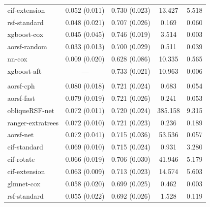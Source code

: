 \documentclass[twoside,11pt]{article}\usepackage[]{graphicx}\usepackage[]{xcolor}
\newenvironment{knitrout}{}{} %
\begin{document}
\begin{knitrout}
\begin{longtable}[t]{lcccc}
\hspace{1em}cif-extension & 0.052 (0.011) & 0.730 (0.023) & 13.427 & 5.518\\
\hspace{1em}rsf-standard & 0.048 (0.021) & 0.707 (0.026) & 0.169 & 0.060\\
\hspace{1em}xgboost-cox & 0.045 (0.045) & 0.746 (0.019) & 3.514 & 0.003\\
\hspace{1em}aorsf-random & 0.033 (0.013) & 0.700 (0.029) & 0.511 & 0.039\\
\hspace{1em}nn-cox & 0.009 (0.020) & 0.628 (0.086) & 10.335 & 0.565\\
\hspace{1em}xgboost-aft & --- & 0.733 (0.021) & 10.963 & 0.006\\
\addlinespace[0.3em]
\multicolumn{5}{l}{\textit{\textbf{GUIDE-IT; HF hospitalization, n = 894, p = 59}}}\\
\hline
\hspace{1em}aorsf-cph & 0.080 (0.018) & 0.721 (0.024) & 0.683 & 0.054\\
\hspace{1em}aorsf-fast & 0.079 (0.019) & 0.721 (0.026) & 0.241 & 0.053\\
\hspace{1em}obliqueRSF-net & 0.072 (0.011) & 0.720 (0.024) & 385.158 & 9.315\\
\hspace{1em}ranger-extratrees & 0.072 (0.010) & 0.721 (0.023) & 0.236 & 0.189\\
\hspace{1em}aorsf-net & 0.072 (0.041) & 0.715 (0.036) & 53.536 & 0.057\\
\hspace{1em}cif-standard & 0.069 (0.010) & 0.715 (0.024) & 0.931 & 3.280\\
\hspace{1em}cif-rotate & 0.066 (0.019) & 0.706 (0.030) & 41.946 & 5.179\\
\hspace{1em}cif-extension & 0.063 (0.009) & 0.713 (0.023) & 14.574 & 5.603\\
\hspace{1em}glmnet-cox & 0.058 (0.020) & 0.699 (0.025) & 0.462 & 0.003\\
\hspace{1em}rsf-standard & 0.055 (0.022) & 0.692 (0.026) & 1.528 & 0.119\\

\end{longtable}
\end{knitrout}
\end{document}
